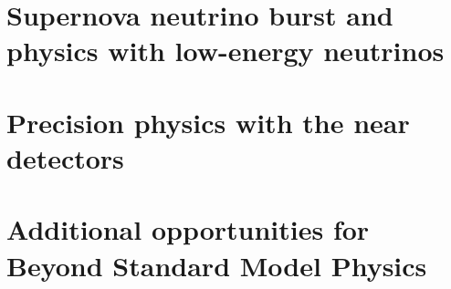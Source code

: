 

\section{Supernova neutrino burst and physics with low-energy neutrinos}
\label{sec:exec-summ-physics-sn-le}



\section{Precision physics with the near detectors}
\label{sec:exec-summ-physics-nd}


\section{Additional opportunities for Beyond Standard Model Physics}
\label{sec:exec-summ-physics-aux}





